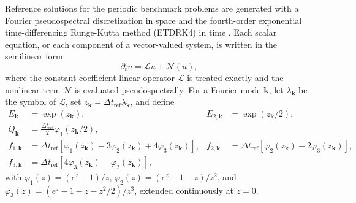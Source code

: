 \documentclass[10pt,reqno]{amsart}
\theoremstyle{remark}
\theoremstyle{definition}
\begin{document}
Reference solutions for the periodic benchmark problems are generated with a
Fourier pseudospectral discretization in space and the fourth-order
exponential time-differencing Runge-Kutta method (ETDRK4) in time
\cite{KassamTrefethen2005}. Each scalar equation, or each component of a
vector-valued system, is written in the semilinear form
\begin{equation}
  \partial_t u=\mathcal L u+\mathcal N(u),
  \label{eq:SM semilinear form}
\end{equation}
where the constant-coefficient linear operator $\mathcal L$ is treated
exactly and the nonlinear term $\mathcal N$ is evaluated pseudospectrally.
For a Fourier mode $\boldsymbol k$, let $\lambda_{\boldsymbol k}$ be the symbol of
$\mathcal L$, set $z_{\boldsymbol k}=\Delta t_{\mathrm{ref}}\lambda_{\boldsymbol k}$,
and define
\begin{equation}
  \begin{aligned}
    E_{\boldsymbol k}&=\exp(z_{\boldsymbol k}),
    &E_{2,\boldsymbol k}&=\exp(z_{\boldsymbol k}/2),\\
    Q_{\boldsymbol k}&=\frac{\Delta t_{\mathrm{ref}}}{2}
      \varphi_1(z_{\boldsymbol k}/2),\\
    f_{1,\boldsymbol k}&=\Delta t_{\mathrm{ref}}
      \left[\varphi_1(z_{\boldsymbol k})-3\varphi_2(z_{\boldsymbol k})
      +4\varphi_3(z_{\boldsymbol k})\right],
    &f_{2,\boldsymbol k}&=\Delta t_{\mathrm{ref}}
      \left[\varphi_2(z_{\boldsymbol k})-2\varphi_3(z_{\boldsymbol k})\right],\\
    f_{3,\boldsymbol k}&=\Delta t_{\mathrm{ref}}
      \left[4\varphi_3(z_{\boldsymbol k})-\varphi_2(z_{\boldsymbol k})\right],
  \end{aligned}
  \label{eq:SM ETDRK4 coefficients}
\end{equation}
with $\varphi_1(z)=(e^z-1)/z$,
$\varphi_2(z)=(e^z-1-z)/z^2$, and
$\varphi_3(z)=(e^z-1-z-z^2/2)/z^3$, extended continuously at $z=0$.
\end{document}

